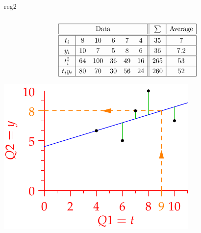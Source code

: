 \begin{example}{}{reg2}
	\begin{minipage}[t]{0.6\linewidth}\vspace{-23pt}
		\[
			\def\arraystretch{1.2}
			\begin{array}[t]{|c|ccccc||c|c|}\hline
				\multicolumn{6}{|c||}{\text{Data}}&\sum&\text{Average}\\\hline\hline
				t_i&8&10&6&7&4&35&7\\\hline
				y_i&10&7&5&8&6&36&7.2\\\hline
				t_i^2&64&100&36&49&16&265&53\\\hline
				t_iy_i&80&70&30&56&24&260&52\\\hline
			\end{array}
		\]
	\end{minipage}
	\hfill
	\begin{minipage}[t]{0.39\linewidth}\vspace{-2pt}
		\flushright\includegraphics{reg-line3}
	\end{minipage}\par\vspace{-45pt}


\end{example}
